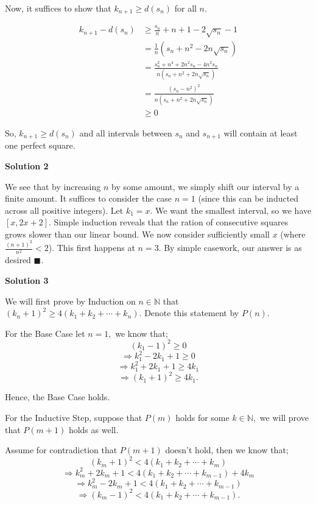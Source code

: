 \begin{enumerate}
 Now, it suffices to show that $k_{n+1}\geq d(s_n)$ for all $n$.

 
 \begin{align*} k_{n+1}-d(s_n)&\geq \frac{s_n}{n}+n+1-2\sqrt{s_n}-1\\ &=\frac{1}{n}(s_n+n^2-2n\sqrt{s_n})\\ &=\frac{s_n^2+n^4+2n^2s_n-4n^2s_n}{n(s_n+n^2+2n\sqrt{s_n})}\\ &=\frac{(s_n-n^2)^2}{n(s_n+n^2+2n\sqrt{s_n})}\\ &\geq 0 \end{align*}


 So, $k_{n+1}\geq d(s_n)$ and all intervals between $s_n$ and $s_{n+1}$ will contain at least one perfect square.

 



\textbf{Solution 2}

We see that by increasing $n$ by some amount, we simply shift our interval by a finite amount. It suffices to consider the case $n=1$ (since this can be inducted across all positive integers). Let $k_1=x$. We want the smallest interval, so we have $[x, 2x+2]$. Simple induction reveals that the ration of consecutive squares grows slower than our linear bound. We now consider sufficiently small $x$ (where $\frac{(n+1)^2}{n^2}<2$). This first happens at $n=3$. By simple casework, our answer is as desired $\blacksquare$.

 


 



\textbf{Solution 3}

We will first prove by Induction on $n\in\mathbb{N}$ that $(k_{n}+1)^2\geq4(k_1+k_2+\cdots +k_{n}).$ Denote this statement by $P(n).$

 For the Base Case let $n=1,$ we know that;
 \[(k_1-1)^2\geq 0\]
 \[\Rightarrow k_1^2-2k_1+1\geq 0\]
 \[\Rightarrow k_1^2+2k_1+1\geq 4k_1\]
 \[\Rightarrow (k_1+1)^2\geq 4k_1.\]

 Hence, the Base Case holds.

 For the Inductive Step, suppose that $P(m)$ holds for some $k\in\mathbb{N},$ we will prove that $P(m+1)$ holds as well.

 Assume for contradiction that $P(m+1)$ doesn't hold, then we know that;
 \[(k_m+1)^2<4(k_1+k_2+\cdots +k_m)\]
 \[\Rightarrow k_m^2+2k_m+1<4(k_1+k_2+\cdots +k_{m-1})+4k_m\]
 \[\Rightarrow k_m^2-2k_m+1<4(k_1+k_2+\cdots +k_{m-1})\]
 \[\Rightarrow (k_m-1)^2<4(k_1+k_2+\cdots +k_{m-1}).\]


\end{enumerate}
